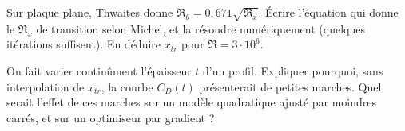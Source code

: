 \exercices
\begin{exercice}
Sur plaque plane, Thwaites donne $\Re_\theta=0{,}671\sqrt{\Re_x}$. Écrire l'équation qui donne le $\Re_x$ de transition selon Michel, et la résoudre numériquement (quelques itérations suffisent). En déduire $x_{tr}$ pour $\Re=3\cdot10^6$.
\end{exercice}
\begin{exercice}
On fait varier continûment l'épaisseur $t$ d'un profil. Expliquer pourquoi, sans interpolation de $x_{tr}$, la courbe $C_D(t)$ présenterait de petites marches. Quel serait l'effet de ces marches sur un modèle quadratique ajusté par moindres carrés, et sur un optimiseur par gradient ?
\end{exercice}
